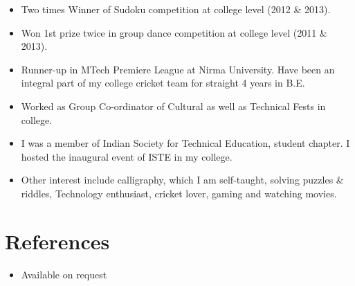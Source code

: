 \documentclass[11pt,a4paper,sans]{moderncv}        %
\begin{document}
\begin{itemize}

\item{Two times Winner of Sudoku competition at college level (2012 \& 2013).}

\vspace{8pt}

\item{Won 1st prize twice in group dance competition at college level (2011 \& 2013).}

\vspace{8pt}

\item{Runner-up in MTech Premiere League at Nirma University. Have been an integral part of my college cricket team for straight 4 years in B.E.}

\vspace{8pt}

\item{Worked as Group Co-ordinator of Cultural as well as Technical Fests in college.}

\vspace{8pt}

\item{I was a member of Indian Society for Technical Education, student chapter. I hosted the inaugural event of ISTE in my college.}

\vspace{8pt}

\item{Other interest include calligraphy, which I am self-taught, solving puzzles \& riddles, Technology enthusiast, cricket lover, gaming and watching movies.}

\end{itemize}

\section{References}

\vspace{8pt}
 
\begin{itemize}

\item{Available on request}

\end{itemize}
\end{document}
